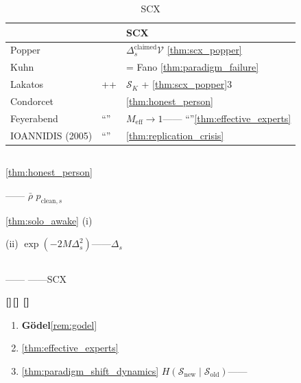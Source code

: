 \documentclass[11pt,a4paper]{article}
\theoremstyle{remark}
\newcommand{\rigorous}{\textnormal{\textbf{[]}}}
\newcommand{\heuristic}{\textnormal{\textbf{[]}}}
\newcommand{\openproblem}{\textnormal{\textbf{[]}}}
\begin{document}
\begin{table}[htbp]
\centering
\caption{SCX}
\label{tab:philosophy_map}
\begin{tabular}{@{}p{3cm}p{5cm}p{5cm}@{}}
\toprule
\textbf{} & \textbf{} & \textbf{SCX} \\
\midrule
Popper &  & $\Delta_s^{\text{claimed}}$$\mathcal{V}$
                  \ref{thm:scx_popper} \\
Kuhn &  &  = Fano
                \ref{thm:paradigm_failure} \\
Lakatos & ++ & $\mathcal{S}_K$ +
                  \ref{thm:scx_popper}3 \\
Condorcet &  & \ref{thm:honest_person} \\
Feyerabend & ``'' & $M_{\text{eff}} \to 1$——
                              ``''\ref{thm:effective_experts} \\
IOANNIDIS (2005) & ``'' & 
                  \ref{thm:replication_crisis} \\
\bottomrule
\end{tabular}
\end{table}

\subsection{}

\textbf{}\ref{thm:honest_person}

——
\textbf{}$\bar{\rho}$
\textbf{}$p_{\text{clean}, s}$

\textbf{}\ref{thm:solo_awake}
(i) 

(ii) $\exp(-2M\Delta_s^2)$——\textbf{$\Delta_s$}



\subsection{}

——
——SCX

$\rigorous$$\heuristic$
$\openproblem$

\textbf{}

\begin{enumerate}[label=(\arabic*)]
    \item \textbf{Gödel}\ref{rem:godel}
    \item \textbf{}
          \ref{thm:effective_experts}
    \item \textbf{}\ref{thm:paradigm_shift_dynamics}
          $H(\mathcal{S}_{\text{new}} \mid \mathcal{S}_{\text{old}})$——
          
\end{enumerate}
\end{document}
